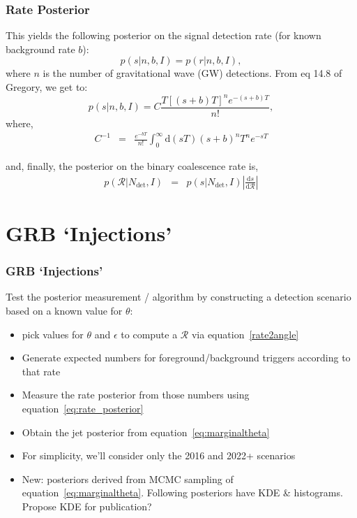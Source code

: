 \documentclass{beamer}
\def\gw#1{gravitational wave#1 (GW#1)\gdef\gw{GW}}
\newcommand{\cbcrate}{{{\mathcal R}}}
\newcommand{\diff}{{\mathrm d}}
\begin{document}
\begin{frame}
    \frametitle{Rate Posterior}
    This yields the following posterior on the signal detection rate (for known
    background rate $b$):
    \begin{equation}
    p(s|n,b,I) = p(r|n,b,I),
    \end{equation}
    where $n$ is the number of \gw{} detections.  From eq 14.8 of Gregory, we get
    to:
    \begin{equation}
    p(s|n,b,I) = C \frac{ T\left[(s+b)T\right]^n e^{-(s+b)T}}{n!},
    \end{equation}
    where,
    \begin{eqnarray}
    C^{-1} & = &\frac{e^{-bT}}{n!} \int_0^{\infty}\diff(sT)(s+b)^n T^n e^{-sT}%
    \end{eqnarray}

    and, finally, the posterior on the binary coalescence rate is,
    \begin{eqnarray}\label{eq:rate_posterior}
    p(\cbcrate|N_{\textrm{det}},I) & = & p(s|N_{\textrm{det}},I) \left|\frac{\diff
    s}{\diff \cbcrate}\right| %
    \end{eqnarray}

\end{frame}

\section{GRB `Injections'}

\begin{frame}

    \frametitle{GRB `Injections'}
    Test the posterior measurement / algorithm by constructing a detection
    scenario based on a known value for $\theta$:

    \begin{itemize}
        \item pick values for $\theta$ and $\epsilon$ to compute a $\cbcrate$
            via equation~\ref{rate2angle}
        \item Generate expected numbers for foreground/background triggers
            according to that rate
        \item Measure the rate posterior from those numbers using
            equation~\ref{eq:rate_posterior}
        \item Obtain the jet posterior from equation~\ref{eq:marginaltheta}
        \item For simplicity, we'll consider only the 2016 and 2022+ scenarios
        \item New: posteriors derived from MCMC sampling of
            equation~\ref{eq:marginaltheta}.  Following posteriors have KDE \&
            histograms.  Propose KDE for publication?
    \end{itemize}

\end{frame}
\end{document}
